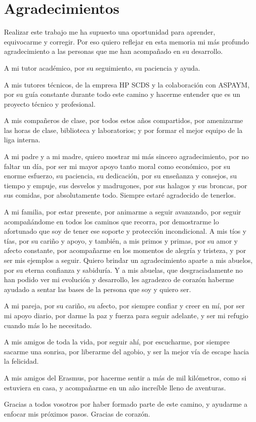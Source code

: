 \chapter*{Agradecimientos}

Realizar este trabajo me ha supuesto una oportunidad para aprender, equivocarme y corregir. Por eso quiero reflejar en esta memoria mi más profundo agradecimiento a las personas que me han acompañado en su desarrollo.

A mi tutor académico, por su seguimiento, su paciencia y ayuda.

A mis tutores técnicos, de la empresa HP SCDS y la colaboración con ASPAYM, por su guía constante durante todo este camino y hacerme entender que es un proyecto técnico y profesional.

A mis compañeros de clase, por todos estos años compartidos, por amenizarme las horas de clase, biblioteca y laboratorios; y por formar el mejor equipo de la liga interna.

A mi padre y a mi madre, quiero mostrar mi más sincero agradecimiento, por no faltar un día, por ser mi mayor apoyo tanto moral como económico, por su enorme esfuerzo, su paciencia, su dedicación, por su enseñanza y consejos, su tiempo y empuje, sus desvelos y madrugones, por sus halagos y sus broncas, por sus comidas, por absolutamente todo. Siempre estaré agradecido de tenerlos.

A mi familia, por estar presente, por animarme a seguir avanzando, por seguir acompañándome en todos los caminos que recorra, por demostrarme lo afortunado que soy de tener ese soporte y protección incondicional.
A mis tíos y tías, por su cariño y apoyo, y también, a mis primos y primas, por su amor y afecto constante, por acompañarme en los momentos de alegría y tristeza, y por ser mis ejemplos a seguir. 
Quiero brindar un agradecimiento aparte a mis abuelos, por su eterna confianza y sabiduría. Y a mis abuelas, que desgraciadamente no han podido ver mi evolución y desarrollo, les agradezco de corazón haberme ayudado a sentar las bases de la persona que soy y quiero ser.

A mi pareja, por su cariño, su afecto, por siempre confiar y creer en mí, por ser mi apoyo diario, por darme la paz y fuerza para seguir adelante, y ser mi refugio cuando más lo he necesitado.

A mis amigos de toda la vida, por seguir ahí, por escucharme, por siempre sacarme una sonrisa, por liberarme del agobio, y ser la mejor vía de escape hacia la felicidad.

A mis amigos del Erasmus, por hacerme sentir a más de mil kilómetros, como si estuviera en casa, y acompañarme en un año increíble lleno de aventuras.

Gracias a todos vosotros por haber formado parte de este camino, y ayudarme a enfocar mis próximos pasos. Gracias de corazón.

\cleardoublepage%
